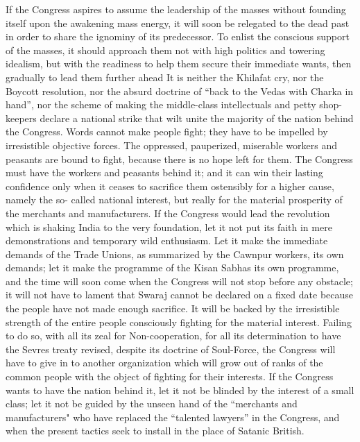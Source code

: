 If the Congress aspires to assume the leadership of the masses without founding itself upon the awakening mass energy, it will soon be relegated to the dead past in order to share the ignominy of its predecessor. To enlist the conscious support of the masses, it should approach them not with high politics and towering idealism, but with the readiness to help them secure their immediate wants, then gradually to lead them further ahead It is neither the Khilafat cry, nor the Boycott resolution, nor the absurd doctrine of “back to the Vedas with Charka in hand”, nor the scheme of making the middle-class intellectuals and petty shop-keepers declare a national strike that wilt unite the majority of the nation behind the Congress. Words cannot make people fight; they have to be impelled by irresistible objective forces. The oppressed, pauperized, miserable workers and peasants are bound to fight, because there is no hope left for them. The Congress must have the workers and peasants behind it; and it can win their lasting confidence only when it ceases to sacrifice them ostensibly for a higher cause, namely the so- called national interest, but really for the material prosperity of the merchants and manufacturers. If the Congress would lead the revolution which is shaking India to the very foundation, let it not put its faith in mere demonstrations and temporary wild enthusiasm. Let it make the immediate demands of the Trade Unions, as summarized by the Cawnpur workers, its own demands; let it make the programme of the Kisan Sabhas its own programme, and the time will soon come when the Congress will not stop before any obstacle; it will not have to lament that Swaraj cannot be declared on a fixed date because the people have not made enough sacrifice. It will be backed by the irresistible strength of the entire people consciously fighting for the material interest. Failing to do so, with all its zeal for Non-cooperation, for all its determination to have the Sevres treaty revised, despite its doctrine of Soul-Force, the Congress will have to give in to another organization which will grow out of ranks of the common people with the object of fighting for their interests. If the Congress wants to have the nation behind it, let it not be blinded by the interest of a small class; let it not be guided by the unseen hand of the “merchants and manufacturers" who have replaced the “talented lawyers” in the Congress, and when the present tactics seek to install in the place of Satanic British. 

